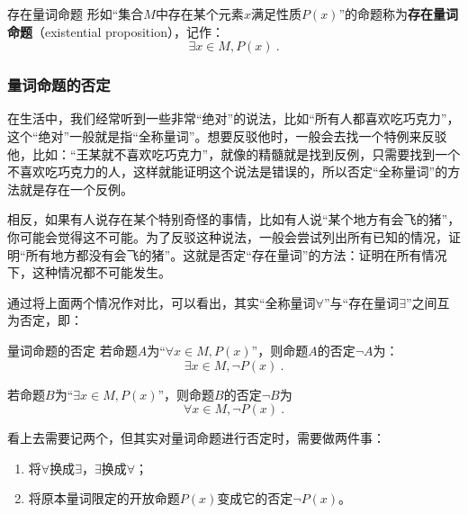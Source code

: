 \begin{definition}{存在量词命题}
形如“集合$M$中存在某个元素$x$满足性质$P(x)$”的命题称为\textbf{存在量词命题}（existential proposition），记作：
\begin{equation}
\exists x\in M,P(x)~.
\end{equation}
\end{definition}

\subsubsection{量词命题的否定}

在生活中，我们经常听到一些非常“绝对”的说法，比如“所有人都喜欢吃巧克力”，这个“绝对”一般就是指“全称量词”。想要反驳他时，一般会去找一个特例来反驳他，比如：“王某就不喜欢吃巧克力”，就像的精髓就是找到反例，只需要找到一个不喜欢吃巧克力的人，这样就能证明这个说法是错误的，所以否定“全称量词”的方法就是存在一个反例。

相反，如果有人说存在某个特别奇怪的事情，比如有人说“某个地方有会飞的猪”，你可能会觉得这不可能。为了反驳这种说法，一般会尝试列出所有已知的情况，证明“所有地方都没有会飞的猪”。这就是否定“存在量词”的方法：证明在所有情况下，这种情况都不可能发生。

通过将上面两个情况作对比，可以看出，其实“全称量词$\forall$”与“存在量词$\exists$”之间互为否定，即：
\begin{definition}{量词命题的否定}
若命题$A$为“$\forall x\in M,P(x)$”，则命题$A$的否定$\lnot A$为：
\begin{equation}
\exists x\in M,\lnot P(x)~.
\end{equation}

若命题$B$为“$\exists x\in M,P(x)$”，则命题$B$的否定$\lnot B$为
\begin{equation}
\forall x\in M,\lnot P(x)~.
\end{equation}
\end{definition}

看上去需要记两个，但其实对量词命题进行否定时，需要做两件事：
\begin{enumerate}
\item 将$\forall$换成$\exists$，$\exists$换成$\forall$；
\item 将原本量词限定的开放命题$P(x)$变成它的否定$\lnot P(x)$。
\end{enumerate}


